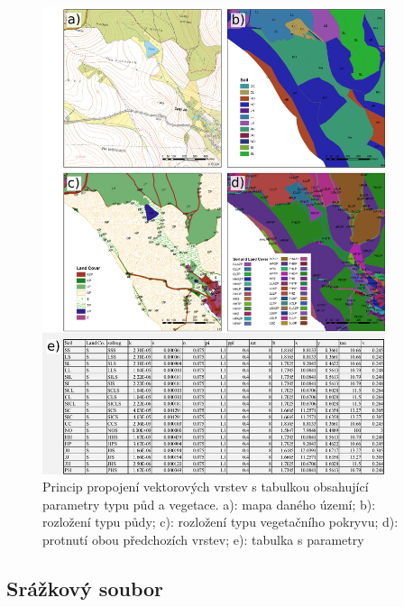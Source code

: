 \begin{figure}[h!]
  \centering
  \includegraphics[width=0.9\textwidth]{./img/LUplusTAB.png} 
  \caption{Princip propojení vektorových vrstev s tabulkou obsahující parametry typu půd a vegetace. a): mapa daného území;  b): rozložení typu půdy; c):  rozložení typu vegetačního pokryvu; d): protnutí obou předchozích vrstev; e): tabulka s parametry}
  \label{fig:pripravapar_vyrez}
\end{figure}











\subsection{Srážkový soubor} \label{sec:vstupsrazka}

